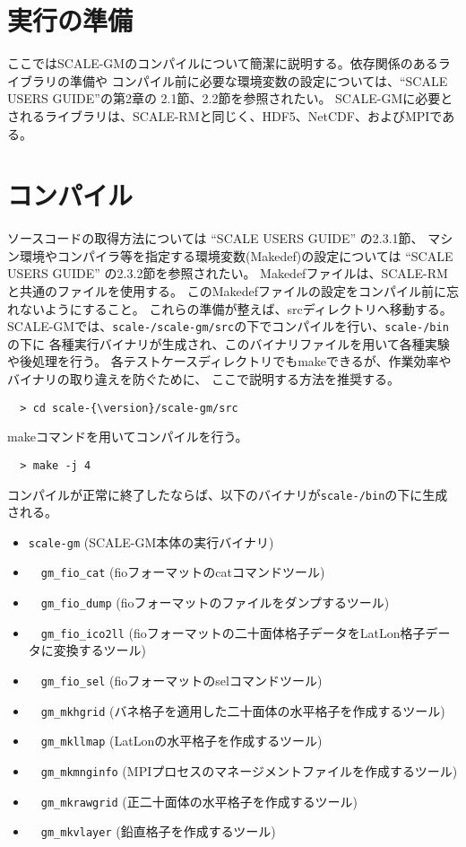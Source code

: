 \section{実行の準備}
ここではSCALE-GMのコンパイルについて簡潔に説明する。依存関係のあるライブラリの準備や
コンパイル前に必要な環境変数の設定については、``SCALE USERS GUIDE''の第2章の
2.1節、2.2節を参照されたい。
SCALE-GMに必要とされるライブラリは、SCALE-RMと同じく、HDF5、NetCDF、およびMPIである。

\section{コンパイル}
ソースコードの取得方法については ``SCALE USERS GUIDE'' の2.3.1節、
マシン環境やコンパイラ等を指定する環境変数(Makedef)の設定については
 ``SCALE USERS GUIDE'' の2.3.2節を参照されたい。
Makedefファイルは、SCALE-RMと共通のファイルを使用する。
このMakedefファイルの設定をコンパイル前に忘れないようにすること。
これらの準備が整えば、srcディレクトリへ移動する。
SCALE-GMでは、\texttt{scale-{\version}/scale-gm/src}の下でコンパイルを行い、\texttt{scale-{\version}/bin}の下に
各種実行バイナリが生成され、このバイナリファイルを用いて各種実験や後処理を行う。
各テストケースディレクトリでもmakeできるが、作業効率やバイナリの取り違えを防ぐために、
ここで説明する方法を推奨する。

\begin{verbatim}
  > cd scale-{\version}/scale-gm/src
\end{verbatim}

\noindent makeコマンドを用いてコンパイルを行う。
\begin{verbatim}
  > make -j 4
\end{verbatim}
コンパイルが正常に終了したならば、以下のバイナリが\texttt{scale-{\version}/bin}の下に生成される。
 \begin{itemize}
   \item \verb|scale-gm| (SCALE-GM本体の実行バイナリ)
   \item　\verb|gm_fio_cat| (fioフォーマットのcatコマンドツール)
   \item　\verb|gm_fio_dump| (fioフォーマットのファイルをダンプするツール)
   \item　\verb|gm_fio_ico2ll| (fioフォーマットの二十面体格子データをLatLon格子データに変換するツール)
   \item　\verb|gm_fio_sel| (fioフォーマットのselコマンドツール)
   \item　\verb|gm_mkhgrid| (バネ格子を適用した二十面体の水平格子を作成するツール)
   \item　\verb|gm_mkllmap| (LatLonの水平格子を作成するツール)
   \item　\verb|gm_mkmnginfo| (MPIプロセスのマネージメントファイルを作成するツール)
   \item　\verb|gm_mkrawgrid| (正二十面体の水平格子を作成するツール)
   \item　\verb|gm_mkvlayer| (鉛直格子を作成するツール)
 \end{itemize}

